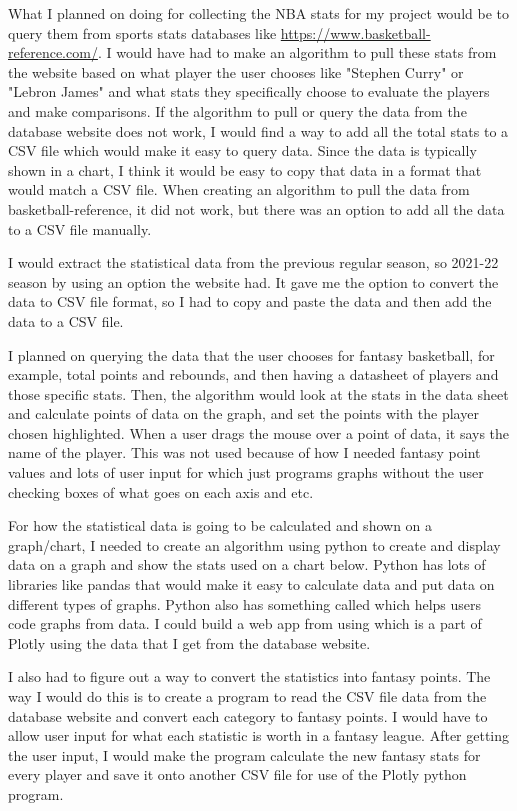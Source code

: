 \documentclass[10pt,twocolumn]{article}
\begin{document}
What I planned on doing for collecting the NBA stats for my project would be to query them from sports stats databases like \url{https://www.basketball-reference.com/}. I would have had to make an algorithm to pull these stats from the website based on what player the user chooses like "Stephen Curry" or "Lebron James" and what stats they specifically choose to evaluate the players and make comparisons. If the algorithm to pull or query the data from the database website does not work, I would find a way to add all the total stats to a CSV file which would make it easy to query data. Since the data is typically shown in a chart, I think it would be easy to copy that data in a format that would match a CSV file. When creating an algorithm to pull the data from basketball-reference, it did not work, but there was an option to add all the data to a CSV file manually.

I would extract the statistical data from the previous regular season, so 2021-22 season by using an option the website had. It gave me the option to convert the data to CSV file format, so I had to copy and paste the data and then add the data to a CSV file. 

I planned on querying the data that the user chooses for fantasy basketball, for example, total points and rebounds, and then having a datasheet of players and those specific stats. Then, the algorithm would look at the stats in the data sheet and calculate points of data on the graph, and set the points with the player chosen highlighted. When a user drags the mouse over a point of data, it says the name of the player. This was not used because of how I needed fantasy point values and lots of user input for \textcite{poltlyInfo} which just programs graphs without the user checking boxes of what goes on each axis and etc. 

For how the statistical data is going to be calculated and shown on a graph/chart, I needed to create an algorithm using python to create and display data on a graph and show the stats used on a chart below. Python has lots of libraries like pandas that would make it easy to calculate data and put data on different types of graphs. Python also has something called \textcite{poltlyInfo} which helps users code graphs from data. I could build a web app from using \textcite{dashInfo} which is a part of Plotly using the data that I get from the database website. 

I also had to figure out a way to convert the statistics into fantasy points. The way I would do this is to create a program to read the CSV file data from the database website and convert each category to fantasy points. I would have to allow user input for what each statistic is worth in a fantasy league. After getting the user input, I would make the program calculate the new fantasy stats for every player and save it onto another CSV file for use of the Plotly python program. 
\end{document}
